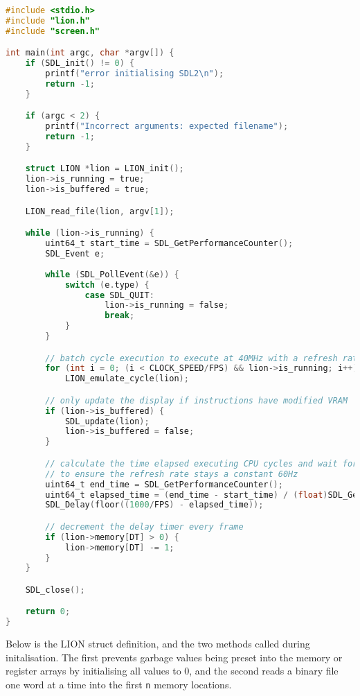 \begin{lstlisting}[language=C]
#include <stdio.h>
#include "lion.h"
#include "screen.h"

int main(int argc, char *argv[]) {
    if (SDL_init() != 0) {
        printf("error initialising SDL2\n");
        return -1;
    }

    if (argc < 2) {
        printf("Incorrect arguments: expected filename");
        return -1;
    }

    struct LION *lion = LION_init();
    lion->is_running = true;
    lion->is_buffered = true; 

    LION_read_file(lion, argv[1]);

    while (lion->is_running) {
        uint64_t start_time = SDL_GetPerformanceCounter();
        SDL_Event e;
        
        while (SDL_PollEvent(&e)) {
            switch (e.type) {
                case SDL_QUIT:
                    lion->is_running = false;
                    break;
            }
        }

        // batch cycle execution to execute at 40MHz with a refresh rate of 60Hz
        for (int i = 0; (i < CLOCK_SPEED/FPS) && lion->is_running; i++)
            LION_emulate_cycle(lion);

        // only update the display if instructions have modified VRAM 
        if (lion->is_buffered) {
            SDL_update(lion);
            lion->is_buffered = false;
        }

        // calculate the time elapsed executing CPU cycles and wait for the remaining time 
        // to ensure the refresh rate stays a constant 60Hz
        uint64_t end_time = SDL_GetPerformanceCounter();
        uint64_t elapsed_time = (end_time - start_time) / (float)SDL_GetPerformanceFrequency() * 1000.0f;
        SDL_Delay(floor((1000/FPS) - elapsed_time));

        // decrement the delay timer every frame
        if (lion->memory[DT] > 0) {
            lion->memory[DT] -= 1;
        }
    }

    SDL_close();

    return 0;
}
\end{lstlisting}

Below is the LION struct definition, and the two methods called during initalisation. The first prevents garbage values being preset into the memory or register arrays by initialising all values to 0, and the second reads a binary file one word at a time into the first \texttt{n} memory locations.

